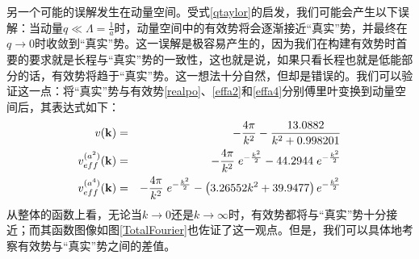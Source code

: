 \documentclass[cs4size,titlepage,twoside]{ctexart}
\begin{document}
另一个可能的误解发生在动量空间。受式\eqref{qtaylor}的启发，我们可能会产生以下误解：当动量$q\ll\Lambda=\displaystyle\frac{1}{a}$时，动量空间中的有效势将会逐渐接近“真实”势，并最终在$q\rightarrow0$时收敛到“真实”势。这一误解是极容易产生的，因为我们在构建有效势时首要的要求就是长程与“真实”势的一致性，这也就是说，如果只看长程也就是低能部分的话，有效势将趋于“真实”势。这一想法十分自然，但却是错误的。我们可以验证这一点：将“真实”势与有效势\eqref{realpo}、\eqref{effa2}和\eqref{effa4}分别傅里叶变换到动量空间后，其表达式如下：
\begin{eqnarray}
	v(\vb{k}) &=& -\frac{4 \pi }{k^2}-\frac{13.0882}{k^2+0.998201} \\
	v_{eff}^{(a^2)}(\vb{k}) &=& -\frac{4 \pi }{k^2}\; e^{-\frac{k^2}{2}}-44.2944\; e^{-\frac{k^2}{2}} \\
	v_{eff}^{(a^4)}(\vb{k}) &=& -\frac{4 \pi  }{k^2}\;e^{-\frac{k^2}{2}}-\left(3.26552 k^2+39.9477\right)e^{-\frac{k^2}{2}}
\end{eqnarray}
从整体的函数上看，无论当$k\rightarrow0$还是$k\rightarrow\infty$时，有效势都将与“真实”势十分接近；而其函数图像如图\ref{TotalFourier}也佐证了这一观点。但是，我们可以具体地考察有效势与“真实”势之间的差值。
\end{document}
